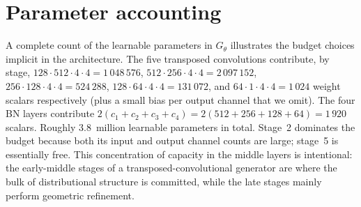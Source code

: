 \section*{Parameter accounting}

A complete count of the learnable parameters in $G_\theta$ illustrates
the budget choices implicit in the architecture. The five transposed
convolutions contribute, by stage,
$128 \cdot 512 \cdot 4 \cdot 4 = 1\,048\,576$,
$512 \cdot 256 \cdot 4 \cdot 4 = 2\,097\,152$,
$256 \cdot 128 \cdot 4 \cdot 4 = 524\,288$,
$128 \cdot 64 \cdot 4 \cdot 4 = 131\,072$, and
$64 \cdot 1 \cdot 4 \cdot 4 = 1\,024$ weight scalars respectively (plus
a small bias per output channel that we omit). The four BN layers
contribute $2(c_1 + c_2 + c_3 + c_4) = 2(512 + 256 + 128 + 64) =
1\,920$ scalars. Roughly $3.8$~million learnable parameters in total.
Stage~2 dominates the budget because both its input and output channel
counts are large; stage~5 is essentially free. This concentration of
capacity in the middle layers is intentional: the early-middle stages
of a transposed-convolutional generator are where the bulk of
distributional structure is committed, while the late stages mainly
perform geometric refinement.
